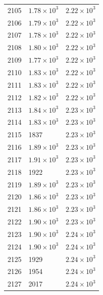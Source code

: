 \begin{table}[H]
\begin{tabular}{lll}
2105 & $\displaystyle 1.78 \times 10^{3}$ & $\displaystyle 2.22 \times 10^{3}$ \\
2106 & $\displaystyle 1.79 \times 10^{3}$ & $\displaystyle 2.22 \times 10^{3}$ \\
2107 & $\displaystyle 1.78 \times 10^{3}$ & $\displaystyle 2.22 \times 10^{3}$ \\
2108 & $\displaystyle 1.80 \times 10^{3}$ & $\displaystyle 2.22 \times 10^{3}$ \\
2109 & $\displaystyle 1.77 \times 10^{3}$ & $\displaystyle 2.22 \times 10^{3}$ \\
2110 & $\displaystyle 1.83 \times 10^{3}$ & $\displaystyle 2.22 \times 10^{3}$ \\
2111 & $\displaystyle 1.83 \times 10^{3}$ & $\displaystyle 2.22 \times 10^{3}$ \\
2112 & $\displaystyle 1.82 \times 10^{3}$ & $\displaystyle 2.22 \times 10^{3}$ \\
2113 & $\displaystyle 1.84 \times 10^{3}$ & $\displaystyle 2.23 \times 10^{3}$ \\
2114 & $\displaystyle 1.83 \times 10^{3}$ & $\displaystyle 2.23 \times 10^{3}$ \\
2115 & 1837 & $\displaystyle 2.23 \times 10^{3}$ \\
2116 & $\displaystyle 1.89 \times 10^{3}$ & $\displaystyle 2.23 \times 10^{3}$ \\
2117 & $\displaystyle 1.91 \times 10^{3}$ & $\displaystyle 2.23 \times 10^{3}$ \\
2118 & 1922 & $\displaystyle 2.23 \times 10^{3}$ \\
2119 & $\displaystyle 1.89 \times 10^{3}$ & $\displaystyle 2.23 \times 10^{3}$ \\
2120 & $\displaystyle 1.86 \times 10^{3}$ & $\displaystyle 2.23 \times 10^{3}$ \\
2121 & $\displaystyle 1.86 \times 10^{3}$ & $\displaystyle 2.23 \times 10^{3}$ \\
2122 & $\displaystyle 1.90 \times 10^{3}$ & $\displaystyle 2.23 \times 10^{3}$ \\
2123 & $\displaystyle 1.90 \times 10^{3}$ & $\displaystyle 2.24 \times 10^{3}$ \\
2124 & $\displaystyle 1.90 \times 10^{3}$ & $\displaystyle 2.24 \times 10^{3}$ \\
2125 & 1929 & $\displaystyle 2.24 \times 10^{3}$ \\
2126 & 1954 & $\displaystyle 2.24 \times 10^{3}$ \\
2127 & 2017 & $\displaystyle 2.24 \times 10^{3}$ \\

\end{tabular}
\end{table}
